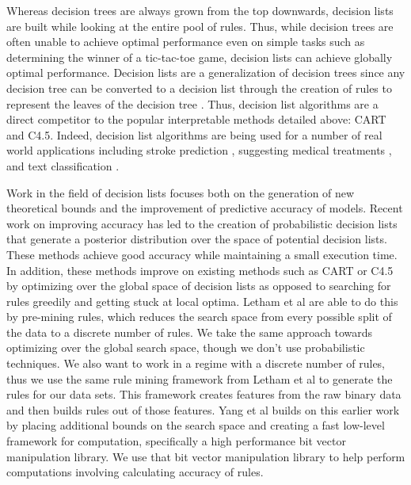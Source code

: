 \documentclass[]{report}
\theoremstyle{definition}
\begin{document}
Whereas decision trees are always grown from the top downwards, decision lists are built while looking at the entire pool of rules.
Thus, while decision trees are often unable to achieve optimal performance even on simple tasks such as determining the winner of a tic-tac-toe game, decision lists can achieve globally optimal performance.
Decision lists are a generalization of decision trees since any decision tree can be converted to a decision list through the creation of rules to represent the leaves of the decision tree \cite{Rivest87}.
Thus, decision list algorithms are a direct competitor to the popular interpretable methods detailed above: CART and C4.5.
Indeed, decision list algorithms are being used for a number of real world applications including stroke prediction \cite{LethamRuMcMa15}, suggesting medical treatments \cite{ZhangLaTsDa2015}, and text classification \cite{LiYa02}.

Work in the field of decision lists focuses both on the generation of new theoretical bounds and the improvement of predictive accuracy of models.
Recent work on improving accuracy has led to the creation of probabilistic decision lists that generate a posterior distribution over the space of potential decision lists\cite{LethamRuMcMa15,YangRuSe16}.
These methods achieve good accuracy while maintaining a small execution time.
In addition, these methods improve on existing methods such as CART or C4.5 by optimizing over the global space of decision lists as opposed to searching for rules greedily and getting stuck at local optima.
Letham et al are able to do this by pre-mining rules, which reduces the search space from every possible split of the data to a discrete number of rules.
We take the same approach towards optimizing over the global search space, though we don’t use probabilistic techniques.
We also want to work in a regime with a discrete number of rules, thus we use the same rule mining framework from Letham et al to generate the rules for our data sets.
This framework creates features from the raw binary data and then builds rules out of those features.
Yang et al builds on this earlier work by placing additional bounds on the search space and creating a fast low-level framework for computation, specifically a high performance bit vector manipulation library.
We use that bit vector manipulation library to help perform computations involving calculating accuracy of rules.
\end{document}

